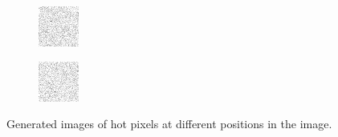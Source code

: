 \begin{figure}[!h]
\begin{subfigure}[t]{.23\textwidth}
    \end{subfigure}
    \begin{subfigure}[t]{.23\textwidth}
        \centering
        \includegraphics[width=\textwidth]{images/hotpixelC.png}
    \end{subfigure}
    \begin{subfigure}[t]{.23\textwidth}
        \centering
        \includegraphics[width=\textwidth]{images/hotpixelD.png}
    \end{subfigure}

    \caption{Generated images of hot pixels at different positions in the image. }
    \label{fig:hotpixelspar}
\end{figure}

